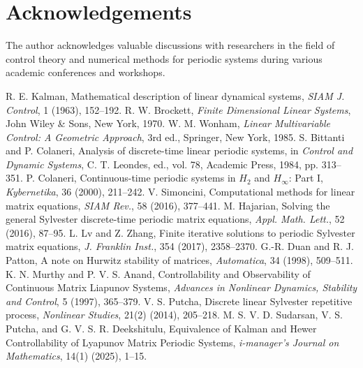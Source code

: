 \documentclass[5p,times]{elsarticle} %
\begin{document}
\section*{Acknowledgements}
The author acknowledges valuable discussions with researchers in the field
of control theory and numerical methods for periodic systems during various
academic conferences and workshops.


\begin{thebibliography}{99}

R. E. Kalman, Mathematical description of linear dynamical systems, \emph{SIAM J. Control}, 1 (1963), 152--192.
R. W. Brockett, \emph{Finite Dimensional Linear Systems}, John Wiley \& Sons, New York, 1970.
W. M. Wonham, \emph{Linear Multivariable Control: A Geometric Approach}, 3rd ed., Springer, New York, 1985.
S. Bittanti and P. Colaneri, Analysis of discrete-time linear periodic systems, in \emph{Control and Dynamic Systems}, C. T. Leondes, ed., vol. 78, Academic Press, 1984, pp. 313--351.
P. Colaneri, Continuous-time periodic systems in \(H_2\) and \(H_\infty\): Part I, \emph{Kybernetika}, 36 (2000), 211--242.
V. Simoncini, Computational methods for linear matrix equations, \emph{SIAM Rev.}, 58 (2016), 377--441.
M. Hajarian, Solving the general Sylvester discrete-time periodic matrix equations, \emph{Appl. Math. Lett.}, 52 (2016), 87--95.
L. Lv and Z. Zhang, Finite iterative solutions to periodic Sylvester matrix equations, \emph{J. Franklin Inst.}, 354 (2017), 2358--2370.
G.-R. Duan and R. J. Patton, A note on Hurwitz stability of matrices, \emph{Automatica}, 34 (1998), 509--511.
K. N. Murthy and P. V. S. Anand, Controllability and Observability of Continuous Matrix Liapunov Systems, \emph{Advances in Nonlinear Dynamics, Stability and Control}, 5 (1997), 365--379.
V. S. Putcha, Discrete linear Sylvester repetitive process, \emph{Nonlinear Studies}, 21(2) (2014), 205--218.
M. S. V. D. Sudarsan, V. S. Putcha, and G. V. S. R. Deekshitulu, Equivalence of Kalman and Hewer Controllability of Lyapunov Matrix Periodic Systems, \emph{i-manager's Journal on Mathematics}, 14(1) (2025), 1--15.
\end{thebibliography}

\appendix
\end{document}
